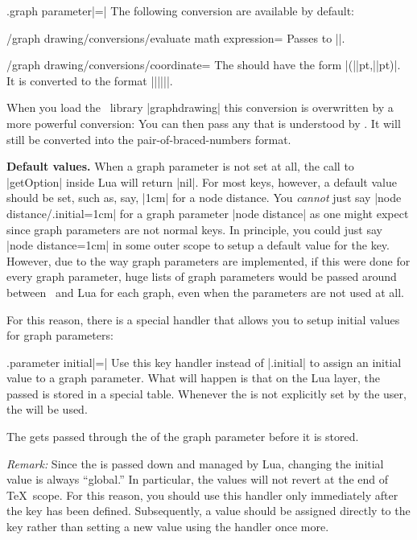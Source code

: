 \begin{handler}{{.graph parameter}|=|}
  The following conversion are available by default:
  \begin{key}{/graph drawing/conversions/evaluate math
      expression=}
    Passes  to |\pgfmathparse|.    
  \end{key}
  \begin{key}{/graph drawing/conversions/coordinate=}
    The  should have the form
    |(||pt,||pt)|. It is converted to the
    format |{||}{||}|.

    When you load the \tikzname\ library |graphdrawing| this
    conversion is overwritten by a more powerful conversion: You can
    then pass any  that is understood by
    \tikzname. It will still be converted into the
    pair-of-braced-numbers format.
  \end{key}
  
  \medskip
  \noindent\textbf{Default values.}
  When a graph parameter is not set at all, the call to |getOption|
  inside Lua will return |nil|. For most keys, however, a default
  value should be set, such as, say, |1cm| for a node distance. You
  \emph{cannot} just say |node distance/.initial=1cm| for a graph
  parameter |node distance| as one might expect since graph parameters
  are not normal keys. In principle, you could just say
  |node distance=1cm| in some outer scope to setup a default value for the
  key. However, due to the way graph parameters are implemented, if
  this were done for every graph parameter, huge lists of graph
  parameters would be passed around between \pgfname\ and Lua for each
  graph, even when the parameters are not used at all.

  For this reason, there is a special handler that allows you to setup
  initial values for graph parameters:
  \begin{handler}{{.parameter initial}|=|}
    Use this key handler instead of |.initial| to assign an initial value
    to a graph parameter. What will happen is that on the Lua layer,
    the passed  is stored in a special table. Whenever the
     is not explicitly set by the user, the 
    will be used.

    The  gets passed through the  of the
    graph parameter before it is stored.

    \emph{Remark:} Since the  is passed down and managed
    by Lua, changing the initial value is always ``global.'' In
    particular, the values will not revert at the end of \TeX\
    scope. For this reason, you should use this handler only
    immediately after the key has been defined. Subsequently, a value
    should be assigned directly to the key rather than setting a new
    value using the handler once more.
\begin{codeexample}
\end{codeexample}
  \end{handler}
\end{handler}

